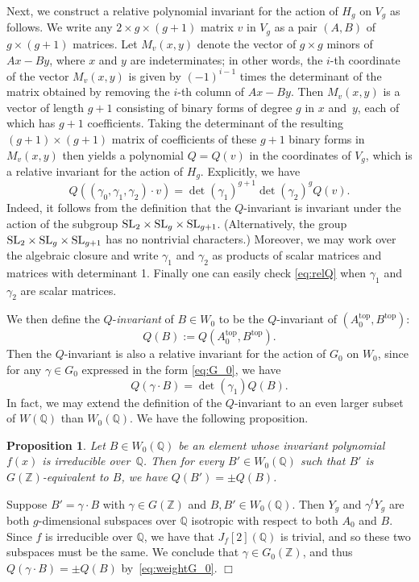 \documentclass[11pt]{article}
\def\Z{{\mathbb Z}}
\def\SL{{\rm SL}}
\def\Q{{\mathbb Q}}
\def\Z{{\mathbb Z}}
\def\Q{{\mathbb Q}}
\def\sub{{\textrm{top}}}
\newtheorem{proposition}[theorem]{Proposition}
\newenvironment{proof}{\noindent {\bf Proof:}}{$\Box$ \vspace{2 ex}}
\begin{document}
Next, we construct a relative polynomial invariant for the action of $H_g$ on
$V_g$ as follows.  We write any $2\times g\times (g+1)$ matrix $v$ in
$V_g$ as a pair $(A,B)$ of $g\times(g+1)$ matrices.  Let $M_v(x,y)$
denote the vector of $g\times g$ minors of $Ax-By$, where $x$ and $y$
are indeterminates; in other words, the $i$-th coordinate of the
vector $M_v(x,y)$ is given by $(-1)^{i-1}$ times the determinant of
the matrix obtained by removing the $i$-th column of $Ax-By$.  Then
$M_v(x,y)$ is a vector of length $g+1$ consisting of binary forms of
degree $g$ in $x$ and~$y$, each of which has $g+1$ coefficients.
Taking the determinant of the resulting $(g+1)\times(g+1)$ matrix of
coefficients of these $g+1$ binary forms in $M_v(x,y)$ then yields a
polynomial $Q=Q(v)$ in the coordinates of $V_g$, which is a relative
invariant for the action of $H_g$. Explicitly, we have
\begin{equation}\label{eq:relQ}
Q((\gamma_0,\gamma_1,\gamma_2)\cdot v)=\det(\gamma_1)^{g+1}\det(\gamma_2)^g Q(v).
\end{equation}
Indeed, it follows from the definition that the $Q$-invariant is
invariant under the action of the subgroup
$\SL_2\times\SL_g\times\SL_{g+1}$. (Alternatively, the group
$\SL_2\times\SL_g\times\SL_{g+1}$ has no nontrivial characters.)
Moreover, we may work over the algebraic closure and write $\gamma_1$
and $\gamma_2$ as products of scalar matrices and matrices with
determinant 1.  Finally one can easily check \eqref{eq:relQ} when
$\gamma_1$ and $\gamma_2$ are scalar matrices.

We then define the $Q$-{\it invariant} of $B\in W_0$ to be the
$Q$-invariant of $(A_0^\sub,B^\sub)$:
\begin{equation}\label{eqQB}
Q(B):=Q(A_0^\sub,B^\sub).
\end{equation}
Then the $Q$-invariant is also a relative invariant for the action of $G_0$ on $W_0$, since for any
$\gamma\in G_0$ expressed in the form \eqref{eq:G_0}, we have
\begin{equation}\label{eq:weightG_0}
Q(\gamma\cdot B) = \det(\gamma_1)Q(B).
\end{equation}
In fact, we may extend the definition of the $Q$-invariant to an even
larger subset of $W(\Q)$ than $W_0(\Q)$. We have the following
proposition.

\begin{proposition}\label{prop:extendQ}
Let $B\in W_0(\Q)$ be an element whose invariant polynomial $f(x)$ is
irreducible over~$\Q$. Then for every $B'\in W_0(\Q)$ such that $B'$ is $G(\Z)$-equivalent to $B$, we have
$Q(B')=\pm Q(B)$.
\end{proposition}
\begin{proof}
Suppose $B'=\gamma\cdot B$ with $\gamma\in G(\Z)$ and $B,B'\in
W_0(\Q)$.  Then $Y_g$ and $\gamma^t Y_g$ are both $g$-dimensional
subspaces over $\Q$ isotropic with respect to both $A_0$ and
$B$. Since $f$ is irreducible over $\Q$, we have that $J_f[2](\Q)$ is
trivial, and so these two subspaces must be the same.  We conclude
that $\gamma\in G_0(\Z)$, and thus $Q(\gamma\cdot B)=\pm Q(B)$
by~\eqref{eq:weightG_0}.
\end{proof}
\end{document}
